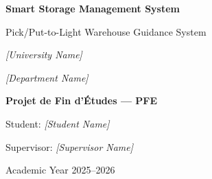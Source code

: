 \documentclass[12pt,a4paper]{report}
\begin{document}
\begin{titlepage}
  \centering
  \vspace*{2cm}
  {\Huge\bfseries\color{ssmsBlue} Smart Storage Management System\par}
  \vspace{0.5cm}
  {\Large Pick/Put-to-Light Warehouse Guidance System\par}
  \vspace{1.5cm}
  {\large \textit{[University Name]}\par}
  \vspace{0.3cm}
  {\large \textit{[Department Name]}\par}
  \vspace{2cm}
  {\large\textbf{Projet de Fin d'\'Etudes --- PFE}\par}
  \vspace{1cm}
  {\large Student: \textit{[Student Name]}\par}
  {\large Supervisor: \textit{[Supervisor Name]}\par}
  \vfill
  {\large Academic Year 2025--2026\par}
\end{titlepage}

\tableofcontents
\listoffigures
\listoftables
\lstlistoflistings







\begin{appendices}

\end{appendices}

\printbibliography
\end{document}
